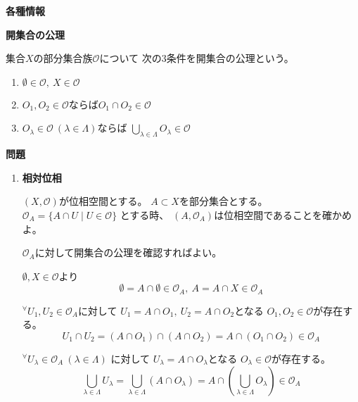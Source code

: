 \documentclass[12pt,b5paper]{ltjsarticle}
\begin{document}
\hrulefill
\textbf{各種情報}
\hrulefill

\textbf{開集合の公理}

集合$X$の部分集合族$\mathcal{O}$について
次の3条件を開集合の公理という。
\begin{enumerate}
 \item $\emptyset\in\mathcal{O},\ X\in\mathcal{O}$
 \item $O_1,O_2\in\mathcal{O}$ならば$O_1\cap O_2\in\mathcal{O}$
 \item $O_{\lambda}\in\mathcal{O} \ (\lambda\in\Lambda)$ならば
       $\bigcup_{\lambda\in\Lambda}O_{\lambda}\in\mathcal{O}$
\end{enumerate}


\hrulefill
\textbf{問題}
\hrulefill

\begin{enumerate}
 \item
      \textbf{相対位相}
      
      $(X,\mathcal{O})$が位相空間とする。
      $A\subset X$を部分集合とする。
      $\mathcal{O}_A = \{ A\cap U\mid U\in\mathcal{O} \}$
      とする時、
      $(A,\mathcal{O}_A)$は位相空間であることを確かめよ。

      \dotfill

      $\mathcal{O}_A$に対して開集合の公理を確認すればよい。

      $\emptyset, X\in\mathcal{O}$より
      \begin{equation}
       \emptyset = A\cap \emptyset \in\mathcal{O}_A,\
       A = A\cap X \in\mathcal{O}_A
      \end{equation}

      ${}^{\forall}U_1,U_2\in\mathcal{O}_A$に対して
      $U_1=A\cap O_1,\ U_2=A\cap O_2$となる
      $O_1,O_2\in\mathcal{O}$が存在する。
      \begin{equation}
       U_1\cap U_2 = (A\cap O_1) \cap (A\cap O_2)
        = A\cap (O_1 \cap O_2) \in\mathcal{O}_A
      \end{equation}


      ${}^{\forall}U_\lambda\in\mathcal{O}_A\ (\lambda\in\Lambda)$
      に対して
      $U_\lambda=A\cap O_\lambda$となる
      $O_\lambda\in\mathcal{O}$が存在する。
      \begin{equation}
       \bigcup_{\lambda\in\Lambda}U_\lambda
        = \bigcup_{\lambda\in\Lambda}(A\cap O_\lambda)
        = A\cap \left( \bigcup_{\lambda\in\Lambda} O_\lambda \right)
        \in\mathcal{O}_A
      \end{equation}


\end{enumerate}
\end{document}
